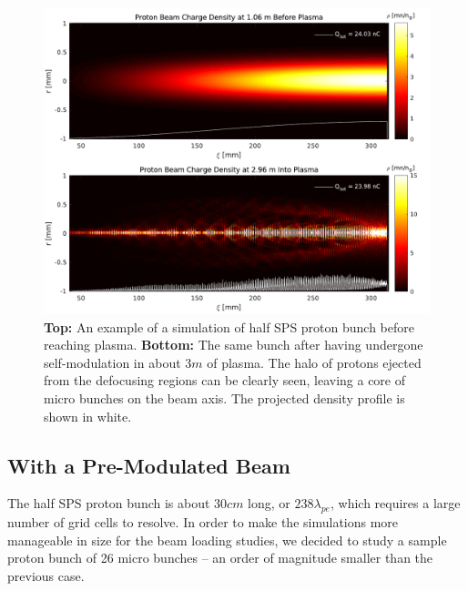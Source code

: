 \begin{figure}[hbt]
    \centering
    \includegraphics[width=1.0\linewidth]{figures/PBSelfModulationBefAft}
    \caption{\label{Fig:Sim:SMI}
        \textbf{Top:} An example of a simulation of half SPS proton bunch before reaching plasma.
        \textbf{Bottom:} The same bunch after having undergone self-modulation in about $3\unit{m}$ of plasma.
        The halo of protons ejected from the defocusing regions can be clearly seen, leaving a core of micro bunches on the beam axis.
        The projected density profile is shown in white.
    }
\end{figure}


\subsection{With a Pre-Modulated Beam}
\label{Sim:PBPreMod}

The half SPS proton bunch is about $30\unit{cm}$ long, or $238\lambda_{pe}$, which requires a large number of grid cells to resolve.
In order to make the simulations more manageable in size for the beam loading studies, we decided to study a sample proton bunch of 26 micro bunches -- an order of magnitude smaller than the previous case.

